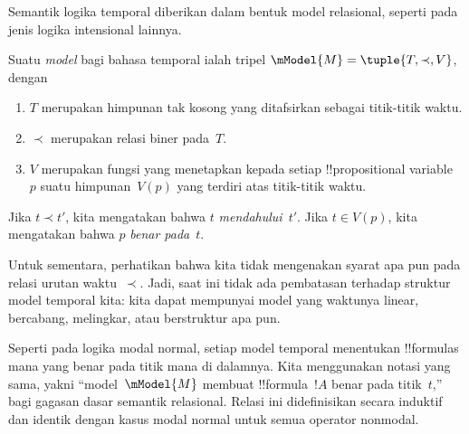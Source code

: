 \documentclass[../../../include/open-logic-section]{subfiles}
\begin{document}
Semantik logika temporal diberikan dalam bentuk model relasional, seperti
pada jenis logika intensional lainnya.

\begin{defn}
  Suatu \emph{model} bagi bahasa temporal ialah tripel
  $\mModel{M}=\tuple{T,\prec,V}$, dengan
  \begin{enumerate}
  \item $T$ merupakan himpunan tak kosong yang ditafsirkan sebagai titik-titik
    waktu.
  \item $\prec$ merupakan relasi biner pada~$T$.
  \item $V$ merupakan fungsi yang menetapkan kepada setiap !!{propositional
    variable}~$p$ suatu himpunan~$V(p)$ yang terdiri atas titik-titik waktu.
  \end{enumerate}
  Jika $t\prec t'$, kita mengatakan bahwa $t$ \emph{mendahului}~$t'$.
  Jika $t\in V(p)$, kita mengatakan bahwa $p$ \emph{benar pada}~$t$.
\end{defn}

Untuk sementara, perhatikan bahwa kita tidak mengenakan syarat apa pun pada
relasi urutan waktu~$\prec$. Jadi, saat ini tidak ada pembatasan terhadap
struktur model temporal kita: kita dapat mempunyai model yang waktunya
linear, bercabang, melingkar, atau berstruktur apa pun.

Seperti pada logika modal normal, setiap model temporal menentukan
!!{formula}s mana yang benar pada titik mana di dalamnya. Kita menggunakan
notasi yang sama, yakni ``model~$\mModel{M}$ membuat !!{formula}~$!A$ benar
pada titik~$t$,'' bagi gagasan dasar semantik relasional. Relasi ini
didefinisikan secara induktif dan identik dengan kasus modal normal untuk
semua operator nonmodal.
\end{document}

